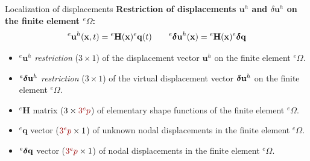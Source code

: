\documentclass[aspectratio=169]{beamer}
\begin{document}
\begin{frame}{Localization of displacements}
  \textbf{Restriction of displacements $\mathbf{u}^h$ and $\delta \mathbf{u}^h$ on the finite element $^e \Omega$:}
  $$
    {}^e\mathbf{u}^h(\mathbf{x}, t) = {}^e\mathbf{H}(\mathbf{x}) {}^e\mathbf{q}(t) \qquad {}^e\boldsymbol\delta \mathbf{u}^h(\mathbf{x}) = {}^e\mathbf{H}(\mathbf{x}) ^e\boldsymbol\delta\mathbf{q}
  $$
  \vspace{-0.5cm}
  \begin{itemize}
    \item $^e\mathbf{u}^h$ \emph{restriction} ($3\times 1$) of the displacement vector $\mathbf{u}^h$ on the finite element $^e\Omega$.
    \item ${}^e\boldsymbol\delta\mathbf{u}^h$ \emph{restriction} ($3\times 1$) of the virtual displacement vector $\boldsymbol\delta\mathbf{u}^h$ on the finite element $^e\Omega$.
    \item $^e\mathbf{H}$ matrix ($3\times \textcolor{darkred}{3{}^e p}$) of elementary shape functions of the finite element $^e\Omega$.
    \item $^e\mathbf{q}$ vector ($\textcolor{darkred}{3{}^e p}\times 1$) of unknown nodal displacements in the finite element $^e\Omega$.
    \item  $^e\boldsymbol\delta\mathbf{q}$ vector ($\textcolor{darkred}{3{}^e p}\times 1$) of nodal displacements in the finite element $^e\Omega$.
  \end{itemize}
\end{frame}
\end{document}
